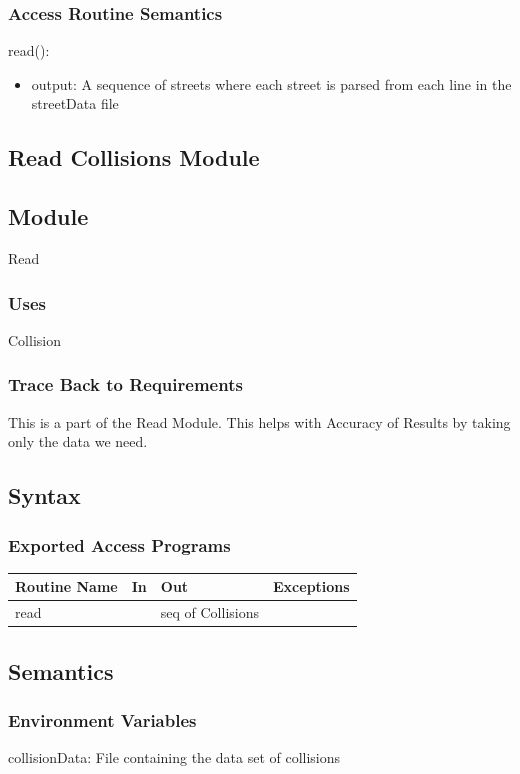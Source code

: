 \documentclass[12pt]{article}
\begin{document}
\subsubsection*{Access Routine Semantics}

read():
\begin{itemize}
    \item output: A sequence of streets where each street is parsed from each line in the streetData file
\end{itemize}

\newpage
\subsection{Read Collisions Module}
\subsection*{Module}
Read

\subsubsection*{Uses}
Collision

\subsubsection*{Trace Back to Requirements}
This is a part of the Read Module. This helps with Accuracy of Results by taking only the data we need.

\subsection*{Syntax}
\subsubsection*{Exported Access Programs}
    \begin{tabular}{|l|l|l|l|}
    \hline
    \textbf{Routine Name} & \textbf{In} & \textbf{Out} & \textbf{Exceptions}\\
    \hline
    read & ~ & seq of Collisions & ~\\
    \hline
    \end{tabular}
    
\subsection*{Semantics}
\subsubsection*{Environment Variables}
collisionData: File containing the data set of collisions
\end{document}
